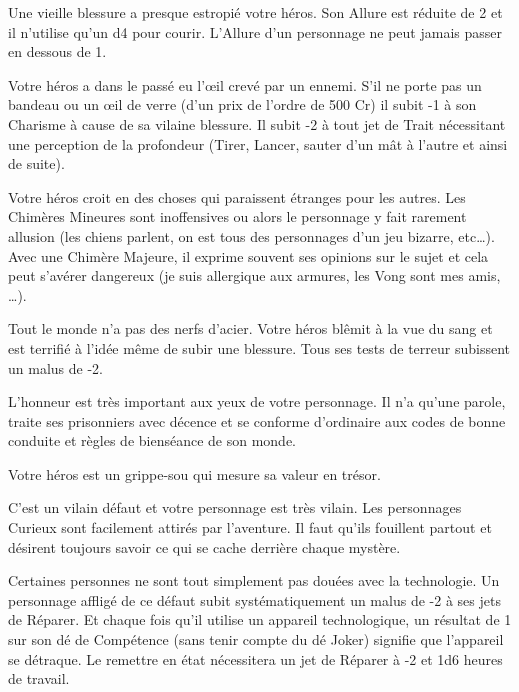 \begin{description}[align=left]
    \item [Boiteux (Majeur)]
        Une vieille blessure a presque estropié votre héros. Son Allure est réduite de 2 et il n'utilise qu'un d4 pour courir. L'Allure d’un personnage ne peut jamais passer en dessous de 1.

    \item [Borgne (Majeur)]
        Votre héros a dans le passé eu l'\oe{il} crevé par un ennemi. S'il ne porte pas un bandeau ou un \oe{il} de verre (d'un prix de l'ordre de 500 Cr) il subit -1 à son Charisme à cause de sa vilaine blessure. Il subit -2 à tout jet de Trait nécessitant une perception de la profondeur (Tirer, Lancer, sauter d'un mât à l'autre et ainsi de suite).

    \item [Chimères (Mineur ou Majeur)]
        Votre héros croit en des choses qui paraissent étranges pour les autres. Les Chimères Mineures sont inoffensives ou alors le personnage y fait rarement allusion (les chiens parlent, on est tous des personnages d'un jeu bizarre, etc\ldots).\\
        Avec une Chimère Majeure, il exprime souvent ses opinions sur le sujet et cela peut s'avérer dangereux (je suis allergique aux armures, les Vong sont mes amis, \ldots).

    \item [Couard (Majeur)]
        Tout le monde n'a pas des nerfs d'acier. Votre héros blêmit à la vue du sang et est terrifié à l'idée même de subir une blessure. Tous ses tests de terreur subissent un malus de -2.

    \item [Code d'Honneur (Majeur)]
        L'honneur est très important aux yeux de votre personnage. Il n'a qu'une parole, traite ses prisonniers avec décence et se conforme d'ordinaire aux codes de bonne conduite et règles de bienséance de son monde.

    \item [Cupide (Mineur)]
        Votre héros est un grippe-sou qui mesure sa valeur en trésor.

    \item [Curieux (Majeur)]
        C'est un vilain défaut et votre personnage est très vilain. Les personnages Curieux sont facilement attirés par l'aventure. Il faut qu'ils fouillent partout et désirent toujours savoir ce qui se cache derrière chaque mystère.

    \item [Deux mains gauches (Mineur)]
        Certaines personnes ne sont tout simplement pas douées avec la technologie. Un personnage affligé de ce défaut subit systématiquement un malus de -2 à ses jets de Réparer. Et chaque fois qu'il utilise un appareil technologique, un résultat de 1 sur son dé de Compétence (sans tenir compte du dé Joker) signifie que l'appareil se détraque. Le remettre en état nécessitera un jet de Réparer à -2 et 1d6 heures de travail.


\end{description}
